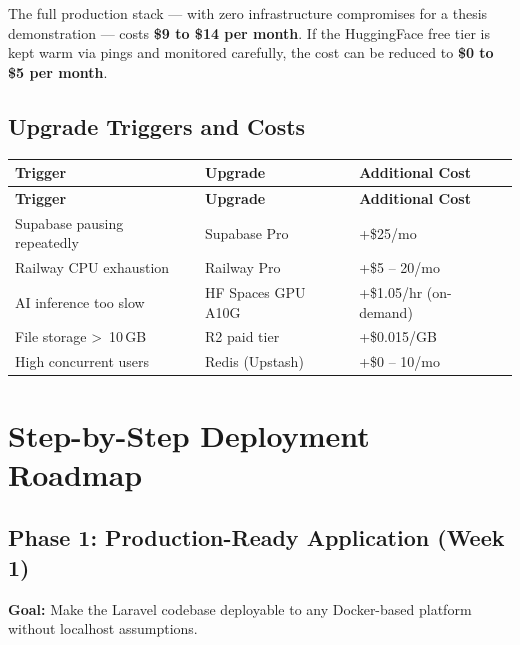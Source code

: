 \documentclass[12pt,a4paper]{report}
\begin{document}
\begin{infobox}
    The full production stack — with zero infrastructure compromises
    for a thesis demonstration — costs \textbf{\$9 to \$14 per month}.
    If the HuggingFace free tier is kept warm via pings and monitored
    carefully, the cost can be reduced to \textbf{\$0 to \$5 per month}.
\end{infobox}

\section{Upgrade Triggers and Costs}

\begin{longtable}{L{4.5cm} L{4cm} R{3.5cm}}
    \toprule
    \textbf{Trigger} & \textbf{Upgrade} & \textbf{Additional Cost} \\
    \midrule
    \endfirsthead
    \toprule
    \textbf{Trigger} & \textbf{Upgrade} & \textbf{Additional Cost} \\
    \midrule
    \endhead
    \bottomrule
    \endlastfoot

    Supabase pausing repeatedly & Supabase Pro & +\$25/mo \\[4pt]
    Railway CPU exhaustion & Railway Pro & +\$5 -- 20/mo \\[4pt]
    AI inference too slow & HF Spaces GPU A10G & +\$1.05/hr (on-demand) \\[4pt]
    File storage \textgreater\ 10\,GB & R2 paid tier & +\$0.015/GB \\[4pt]
    High concurrent users & Redis (Upstash) & +\$0 -- 10/mo \\

\end{longtable}

\chapter{Step-by-Step Deployment Roadmap}
\label{ch:roadmap}

\section{Phase 1: Production-Ready Application (Week 1)}

\textbf{Goal:} Make the Laravel codebase deployable to any Docker-based
platform without localhost assumptions.
\end{document}
